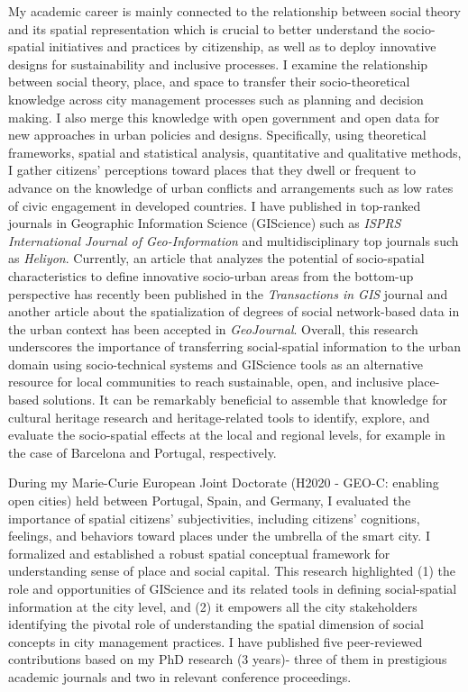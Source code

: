My academic career is mainly connected to the relationship between social theory and its spatial representation which is crucial to better understand the socio-spatial initiatives and practices by citizenship, as well as to deploy innovative designs for sustainability and inclusive processes. I examine the relationship between social theory, place, and space to transfer their socio-theoretical knowledge across city management processes such as planning and decision making. I also merge this knowledge with open government and open data for new approaches in urban policies and designs. Specifically, using theoretical frameworks, spatial and statistical analysis, quantitative and qualitative methods, I gather citizens’ perceptions toward places that they dwell or frequent to advance on the knowledge of urban conflicts and arrangements such as low rates of civic engagement in developed countries. I have published in top-ranked journals in Geographic Information Science (GIScience) such as \textit{ISPRS International Journal of Geo-Information} and multidisciplinary top journals such as \textit{Heliyon}. Currently, an article that analyzes the potential of socio-spatial characteristics to define innovative socio-urban areas from the bottom-up perspective has recently been published in the \textit{Transactions in GIS} journal and another article about the spatialization of degrees of social network-based data in the urban context has been accepted in \textit{GeoJournal}. Overall, this research underscores the importance of transferring social-spatial information to the urban domain using socio-technical systems and GIScience tools as an alternative resource for local communities to reach sustainable, open, and inclusive place-based solutions. It can be remarkably beneficial to assemble that knowledge for cultural heritage research and heritage-related tools to identify, explore, and evaluate the socio-spatial effects at the local and regional levels, for example in the case of Barcelona and Portugal, respectively.\par


During my Marie-Curie European Joint Doctorate (H2020 - GEO-C: enabling open cities) held between Portugal, Spain, and Germany, I evaluated the importance of spatial citizens’ subjectivities, including citizens’ cognitions, feelings, and behaviors toward places under the umbrella of the smart city. I formalized and established a robust spatial conceptual framework for understanding sense of place and social capital. This research highlighted (1) the role and opportunities of GIScience and its related tools in defining social-spatial information at the city level, and (2) it empowers all the city stakeholders identifying the pivotal role of understanding the spatial dimension of social concepts in city management practices. I have published five peer-reviewed contributions based on my PhD research (3 years)- three of them in prestigious academic journals and two in relevant conference proceedings.\par

